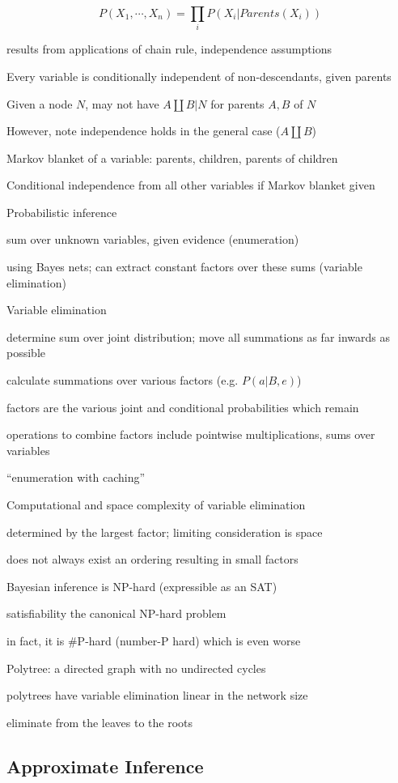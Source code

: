 \documentclass[12pt]{article}
\begin{document}
$$P(X_1, \cdots, X_n) = \prod_iP(X_i|Parents(X_i))$$

results from applications of chain rule, independence assumptions

Every variable is conditionally independent of non-descendants, given parents

Given a node $N$, may not have $A \coprod B | N$ for parents $A, B$ of $N$

However, note independence holds in the general case ($A \coprod B$)

\noindent
Markov blanket of a variable: parents, children, parents of children

Conditional independence from all other variables if Markov blanket given

\noindent
Probabilistic inference

sum over unknown variables, given evidence (enumeration)

using Bayes nets; can extract constant factors over these sums (variable elimination)

\noindent
Variable elimination

determine sum over joint distribution; move all summations as far inwards as possible

calculate summations over various factors (e.g. $P(a|B, e)$)

factors are the various joint and conditional probabilities which remain

operations to combine factors include pointwise multiplications, sums over variables

``enumeration with caching''

\noindent
Computational and space complexity of variable elimination

determined by the largest factor; limiting consideration is space

does not always exist an ordering resulting in small factors

Bayesian inference is NP-hard (expressible as an SAT)

satisfiability the canonical NP-hard problem

in fact, it is $\#$P-hard (number-P hard) which is even worse

\noindent
Polytree: a directed graph with no undirected cycles

polytrees have variable elimination linear in the network size

eliminate from the leaves to the roots

\subsection{Approximate Inference}
\end{document}
